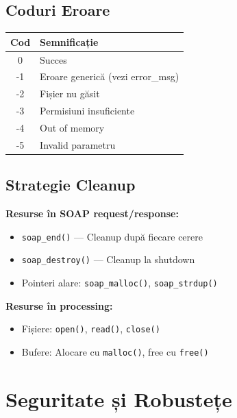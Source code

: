 \documentclass[12pt,a4paper,twoside]{article}
\begin{document}
\begin{itemize}
\subsection{Coduri Eroare}

\begin{table}[H]
    \centering
    \begin{tabular}{|c|l|}
        \toprule
        \textbf{Cod} & \textbf{Semnificație} \\
        \midrule
        0 & Succes \\
        -1 & Eroare generică (vezi error\_msg) \\
        -2 & Fișier nu găsit \\
        -3 & Permisiuni insuficiente \\
        -4 & Out of memory \\
        -5 & Invalid parametru \\
        \bottomrule
    \end{tabular}
\end{table}

\subsection{Strategie Cleanup}

\textbf{Resurse în SOAP request/response:}

\begin{itemize}
    \item \texttt{soap\_end()} --- Cleanup după fiecare cerere
    \item \texttt{soap\_destroy()} --- Cleanup la shutdown
    \item Pointeri alare: \texttt{soap\_malloc()}, \texttt{soap\_strdup()}
\end{itemize}

\textbf{Resurse în processing:}

\begin{itemize}
    \item Fișiere: \texttt{open()}, \texttt{read()}, \texttt{close()}
    \item Bufere: Alocare cu \texttt{malloc()}, free cu \texttt{free()}
\end{itemize}

\section{Seguritate și Robustețe}


\end{itemize}
\end{document}
